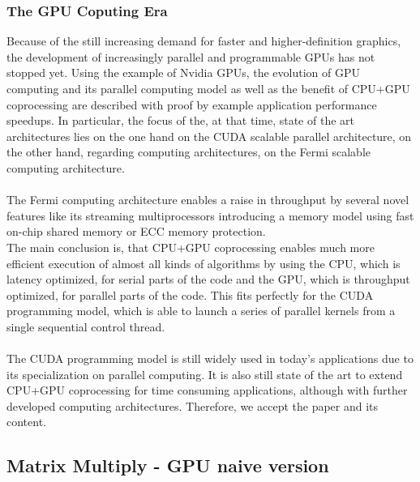 \documentclass[12pt]{article}
\begin{document}
\subsubsection*{The GPU Coputing Era}
Because of the still increasing demand for faster and higher-definition graphics, the development of increasingly parallel and programmable GPUs has not stopped yet. Using the example of Nvidia GPUs, the evolution of GPU computing and its parallel computing model as well as the benefit of CPU+GPU coprocessing are described with proof by example application performance speedups. In particular, the focus of the, at that time, state of the art architectures lies on the one hand on the CUDA scalable parallel architecture, on the other hand, regarding computing architectures, on the Fermi scalable computing architecture.\\\\
The Fermi computing architecture enables a raise in throughput by several novel features like its streaming multiprocessors introducing a memory model using fast on-chip shared memory or ECC memory protection.\\
The main conclusion is, that CPU+GPU coprocessing enables much more efficient execution of almost all kinds of algorithms by using the CPU, which is latency optimized, for serial parts of the code and the GPU, which is throughput optimized, for parallel parts of the code. This fits perfectly for the CUDA programming model, which is able to launch a series of parallel kernels from a single sequential control thread.\\\\
The CUDA programming model is still widely used in today's applications due to its specialization on parallel computing. It is also still state of the art to extend CPU+GPU coprocessing for time consuming applications, although with further developed computing architectures. Therefore, we accept the paper and its content.

\vspace{10pt}

\newpage
\subsection{Matrix Multiply - GPU naive version}
\end{document}
